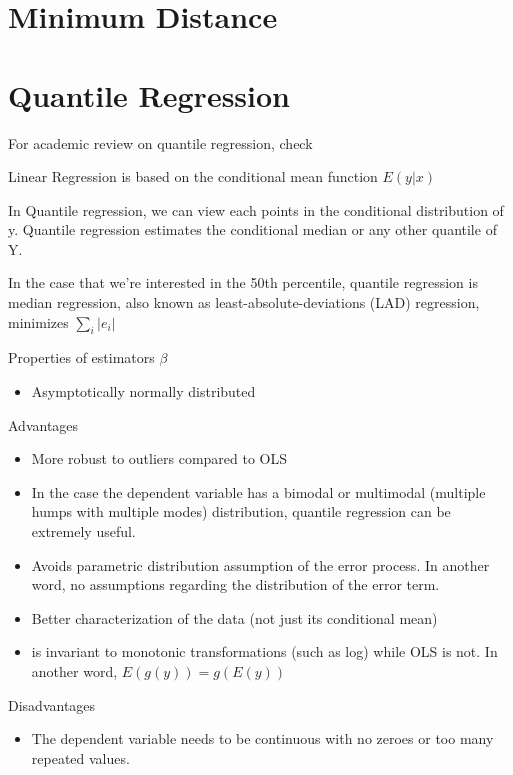 \documentclass[
]{book}
\providecommand{\tightlist}{%
  \setlength{\itemsep}{0pt}\setlength{\parskip}{0pt}}
\begin{document}
\hypertarget{minimum-distance}{%
\chapter{Minimum Distance}\label{minimum-distance}}

\hypertarget{quantile-regression}{%
\chapter{Quantile Regression}\label{quantile-regression}}

For academic review on quantile regression, check \citep{Yu_2003}

Linear Regression is based on the conditional mean function \(E(y|x)\)

In Quantile regression, we can view each points in the conditional distribution of y. Quantile regression estimates the conditional median or any other quantile of Y.

In the case that we're interested in the 50th percentile, quantile regression is median regression, also known as least-absolute-deviations (LAD) regression, minimizes \(\sum_{i}|e_i|\)

Properties of estimators \(\beta\)

\begin{itemize}
\tightlist
\item
  Asymptotically normally distributed
\end{itemize}

Advantages

\begin{itemize}
\tightlist
\item
  More robust to outliers compared to OLS
\item
  In the case the dependent variable has a bimodal or multimodal (multiple humps with multiple modes) distribution, quantile regression can be extremely useful.
\item
  Avoids parametric distribution assumption of the error process. In another word, no assumptions regarding the distribution of the error term.
\item
  Better characterization of the data (not just its conditional mean)
\item
  is invariant to monotonic transformations (such as log) while OLS is not. In another word, \(E(g(y))=g(E(y))\)
\end{itemize}

Disadvantages

\begin{itemize}
\tightlist
\item
  The dependent variable needs to be continuous with no zeroes or too many repeated values.
\end{itemize}
\end{document}
